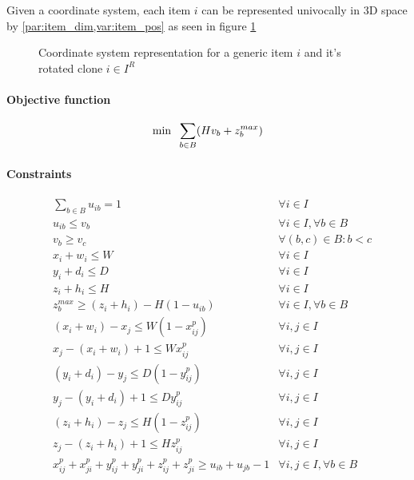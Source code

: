Given a coordinate system, each item $i$ can be represented univocally in 3D space by \cref{par:item_dim,var:item_pos} as seen in figure \ref{fig:coordinate_system}
\begin{figure}
    \scalebox{0.62}{%
    
    }
    \caption{Coordinate system representation for a generic item $i$ and it's rotated clone $i \in I^R$}
    \label{fig:coordinate_system}
\end{figure}

\paragraph*{Objective function}
\begin{equation}
    \label{eq:objective}
    \min \hspace{.2cm} \sum\limits_{b \in B} (H v_b + z^{max}_b)
\end{equation}

\paragraph*{Constraints}
\label{par:standard_const}
\begin{align}
    & \sum\limits_{b \in B}{u_{ib}} = 1 & \forall i \in I  \label{cons:all_items_in_bin} \\
    & u_{ib} \le v_b & \forall i \in I, \forall b \in B \label{cons:items_in_used_bins} \\
    & v_b \ge v_c & \forall (b,c) \in B : b < c  \label{cons:bin_breaking} \\
    & x_i + w_i \le W & \forall i \in I \label{cons:inside_x} \\ 
    & y_i + d_i \le D & \forall i \in I \label{cons:inside_y} \\ 
    & z_i + h_i \le H & \forall i \in I \label{cons:inside_z} \\ 
    & z^{max}_b \ge (z_i + h_i) - H(1-u_{ib}) & \forall i \in I, \forall b \in B \label{cons:maxz} \\
    & (x_i + w_i) - x_j\le W(1 - x^p_{ij}) & \forall i,j \in I \label{cons:x_prec_1} \\
    & x_j - (x_i + w_i) + 1 \le W x^p_{ij} & \forall i,j \in I \label{cons:x_prec_2} \\
    & (y_i + d_i) - y_j \le D(1 - y^p_{ij}) & \forall i,j \in I \label{cons:y_prec_1} \\
    & y_j - (y_i + d_i) + 1 \le D y^p_{ij} & \forall i,j \in I \label{cons:y_prec_2} \\
    & (z_i + h_i) - z_j\le H(1 - z^p_{ij}) & \forall i,j \in I \label{cons:z_prec_1} \\
    & z_j - (z_i + h_i) + 1 \le H z^p_{ij} & \forall i,j \in I \label{cons:z_prec_2} \\
    & x^p_{ij} + x^p_{ji} + y^p_{ij} + y^p_{ji} + z^p_{ij} + z^p_{ji} \ge u_{ib} + u_{jb} - 1 & \forall i,j \in I, \forall b \in B \label{cons:no_overlap}
\end{align}
